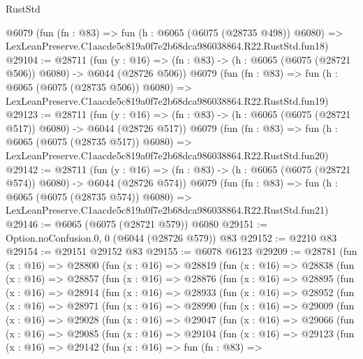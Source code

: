 \begin{lexlean}{RustStd}
\begin{coremodule}
    @6079
    (fun (fn : @83) =>
    fun (h : @6065 (@6075 (@28735 @498)) @6080) =>
    LexLeanPreserve.C1aacde5c819a0f7e2b68dca986038864.R22.RustStd.fun18)
@29104 := @28711
    (fun (y : @16) => (fn : @83) -> (h : @6065 (@6075 (@28721 @506)) @6080) -> @6044 (@28726 @506))
    @6079
    (fun (fn : @83) =>
    fun (h : @6065 (@6075 (@28735 @506)) @6080) =>
    LexLeanPreserve.C1aacde5c819a0f7e2b68dca986038864.R22.RustStd.fun19)
@29123 := @28711
    (fun (y : @16) => (fn : @83) -> (h : @6065 (@6075 (@28721 @517)) @6080) -> @6044 (@28726 @517))
    @6079
    (fun (fn : @83) =>
    fun (h : @6065 (@6075 (@28735 @517)) @6080) =>
    LexLeanPreserve.C1aacde5c819a0f7e2b68dca986038864.R22.RustStd.fun20)
@29142 := @28711
    (fun (y : @16) => (fn : @83) -> (h : @6065 (@6075 (@28721 @574)) @6080) -> @6044 (@28726 @574))
    @6079
    (fun (fn : @83) =>
    fun (h : @6065 (@6075 (@28735 @574)) @6080) =>
    LexLeanPreserve.C1aacde5c819a0f7e2b68dca986038864.R22.RustStd.fun21)
@29146 := @6065 (@6075 (@28721 @579)) @6080
@29151 := Option.noConfusion.{0, 0} (@6044 (@28726 @579)) @83
@29152 := @2210 @83
@29154 := @29151 @29152 @83
@29155 := @6078 @6123
@29209 := @28781
    (fun (x : @16) =>
    @28800
      (fun (x : @16) =>
      @28819
        (fun (x : @16) =>
        @28838
          (fun (x : @16) =>
          @28857
            (fun (x : @16) =>
            @28876
              (fun (x : @16) =>
              @28895
                (fun (x : @16) =>
                @28914
                  (fun (x : @16) =>
                  @28933
                    (fun (x : @16) =>
                    @28952
                      (fun (x : @16) =>
                      @28971
                        (fun (x : @16) =>
                        @28990
                          (fun (x : @16) =>
                          @29009
                            (fun (x : @16) =>
                            @29028
                              (fun (x : @16) =>
                              @29047
                                (fun (x : @16) =>
                                @29066
                                  (fun (x : @16) =>
                                  @29085
                                    (fun (x : @16) =>
                                    @29104
                                      (fun (x : @16) =>
                                      @29123
                                        (fun (x : @16) =>
                                        @29142
                                          (fun (x : @16) =>
                                          fun (fn : @83) =>

\end{coremodule}
\end{lexlean}
